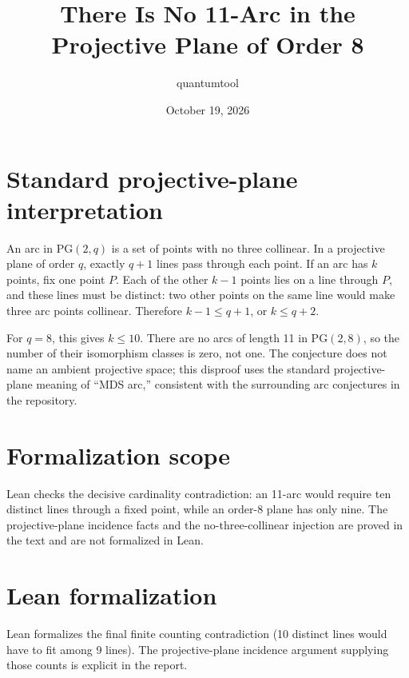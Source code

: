 \documentclass[11pt]{article}
\title{There Is No 11-Arc in the Projective Plane of Order 8}
\author{quantumtool}
\date{October 19, 2026}
\begin{document}
\maketitle
\section*{Standard projective-plane interpretation}
An arc in $\mathrm{PG}(2,q)$ is a set of points with no three collinear. In a projective plane of order $q$, exactly $q+1$ lines pass through each point. If an arc has $k$ points, fix one point $P$. Each of the other $k-1$ points lies on a line through $P$, and these lines must be distinct: two other points on the same line would make three arc points collinear. Therefore $k-1\le q+1$, or $k\le q+2$.

For $q=8$, this gives $k\le 10$. There are no arcs of length 11 in $\mathrm{PG}(2,8)$, so the number of their isomorphism classes is zero, not one. The conjecture does not name an ambient projective space; this disproof uses the standard projective-plane meaning of “MDS arc,” consistent with the surrounding arc conjectures in the repository.

\section*{Formalization scope}
Lean checks the decisive cardinality contradiction: an 11-arc would require ten distinct lines through a fixed point, while an order-8 plane has only nine. The projective-plane incidence facts and the no-three-collinear injection are proved in the text and are not formalized in Lean.
\section*{Lean formalization}
Lean formalizes the final finite counting contradiction (10 distinct lines would have to fit among 9 lines). The projective-plane incidence argument supplying those counts is explicit in the report.
\end{document}
